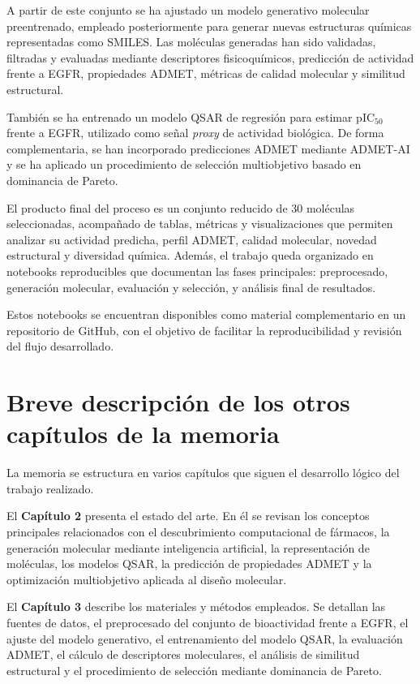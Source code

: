 \documentclass[IB]{TFUOC}%
\begin{document}
A partir de este conjunto se ha ajustado un modelo generativo molecular preentrenado, empleado posteriormente para generar nuevas estructuras químicas representadas como SMILES. Las moléculas generadas han sido validadas, filtradas y evaluadas mediante descriptores fisicoquímicos, predicción de actividad frente a EGFR, propiedades ADMET, métricas de calidad molecular y similitud estructural.

También se ha entrenado un modelo QSAR de regresión para estimar pIC$_{50}$ frente a EGFR, utilizado como señal \textit{proxy} de actividad biológica. De forma complementaria, se han incorporado predicciones ADMET mediante ADMET-AI y se ha aplicado un procedimiento de selección multiobjetivo basado en dominancia de Pareto.

El producto final del proceso es un conjunto reducido de 30 moléculas seleccionadas, acompañado de tablas, métricas y visualizaciones que permiten analizar su actividad predicha, perfil ADMET, calidad molecular, novedad estructural y diversidad química. Además, el trabajo queda organizado en notebooks reproducibles que documentan las fases principales: preprocesado, generación molecular, evaluación y selección, y análisis final de resultados.

Estos notebooks se encuentran disponibles como material complementario en un repositorio de GitHub, con el objetivo de facilitar la reproducibilidad y revisión del flujo desarrollado.


\section{Breve descripción de los otros capítulos de la memoria}

La memoria se estructura en varios capítulos que siguen el desarrollo lógico del trabajo realizado.

El \textbf{Capítulo 2} presenta el estado del arte. En él se revisan los conceptos principales relacionados con el descubrimiento computacional de fármacos, la generación molecular mediante inteligencia artificial, la representación de moléculas, los modelos QSAR, la predicción de propiedades ADMET y la optimización multiobjetivo aplicada al diseño molecular.

El \textbf{Capítulo 3} describe los materiales y métodos empleados. Se detallan las fuentes de datos, el preprocesado del conjunto de bioactividad frente a EGFR, el ajuste del modelo generativo, el entrenamiento del modelo QSAR, la evaluación ADMET, el cálculo de descriptores moleculares, el análisis de similitud estructural y el procedimiento de selección mediante dominancia de Pareto.
\end{document}
